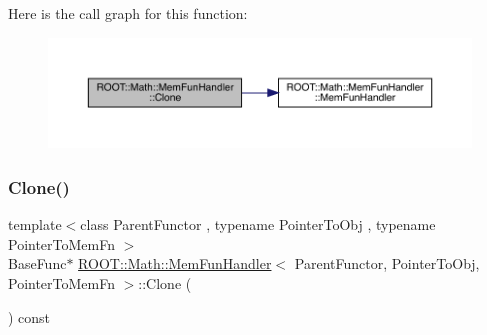 Here is the call graph for this function\+:
\nopagebreak
\begin{figure}[H]
\begin{center}
\leavevmode
\includegraphics[width=350pt]{d6/d5f/classROOT_1_1Math_1_1MemFunHandler_a71089a87a2f1ca482d176caca602f16c_cgraph}
\end{center}
\end{figure}
\mbox{\label{classROOT_1_1Math_1_1MemFunHandler_a71089a87a2f1ca482d176caca602f16c}} 
\subsubsection{\texorpdfstring{Clone()}{Clone()}\hspace{0.1cm}{\footnotesize\ttfamily [2/2]}}
{\footnotesize\ttfamily template$<$class Parent\+Functor , typename Pointer\+To\+Obj , typename Pointer\+To\+Mem\+Fn $>$ \\
Base\+Func$\ast$ \mbox{\hyperlink{classROOT_1_1Math_1_1MemFunHandler}{R\+O\+O\+T\+::\+Math\+::\+Mem\+Fun\+Handler}}$<$ Parent\+Functor, Pointer\+To\+Obj, Pointer\+To\+Mem\+Fn $>$\+::Clone (\begin{DoxyParamCaption}{ }\end{DoxyParamCaption}) const\hspace{0.3cm}{\ttfamily [inline]}}

